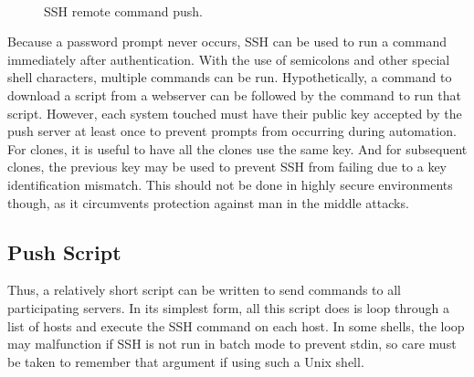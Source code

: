 \begin{figure}
  \begin{center}
  \end{center}
  \caption{SSH remote command push.}
  \label{fig:sshpush}
\
\vskip1pt
\
\vskip1pt
\
\end{figure}


Because a password prompt never occurs, SSH can be used to run a command immediately after authentication.  With the use of semicolons and other special shell characters, multiple commands can be run.  Hypothetically, a command to download a script from a webserver can be followed by the command to run that script.  However, each system touched must have their public key accepted by the push server at least once to prevent prompts from occurring during automation.  For clones, it is useful to have all the clones use the same key.  And for subsequent clones, the previous key may be used to prevent SSH from failing due to a key identification mismatch.  This should not be done in highly secure environments though, as it circumvents protection against man in the middle attacks.  

\subsection{Push Script}
Thus, a relatively short script can be written to send commands to all participating servers.  In its simplest form, all this script does is loop through a list of hosts and execute the SSH command on each host.  In some shells, the loop may malfunction if SSH is not run in batch mode to prevent stdin, so care must be taken to remember that argument if using such a Unix shell.  

